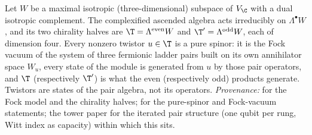 Let $W$ be a maximal isotropic (three-dimensional) subspace of $V_{\C}$ with a dual isotropic complement. The complexified ascended algebra acts irreducibly on $\Lambda^{\bullet}W$, and its two chirality halves are $\T = \Lambda^{\mathrm{even}}W$ and $\T' = \Lambda^{\mathrm{odd}}W$, each of dimension four. Every nonzero twistor $u \in \T$ is a pure spinor: it is the Fock vacuum of the system of three fermionic ladder pairs built on its own annihilator space $W_{u}$, every state of the module is generated from $u$ by those pair operators, and $\T$ (respectively $\T'$) is what the even (respectively odd) products generate. Twistors are states of the pair algebra, not its operators. \emph{Provenance:} \cite[Thm.~3.1]{ButlerT9} for the Fock model and the chirality halves; \cite[Thm.~5.3]{ButlerT9} for the pure-spinor and Fock-vacuum statements; the tower paper \cite[Thms.~4.2, 4.3]{ButlerT3} for the iterated pair structure (one qubit per rung, Witt index as capacity) within which this sits.
